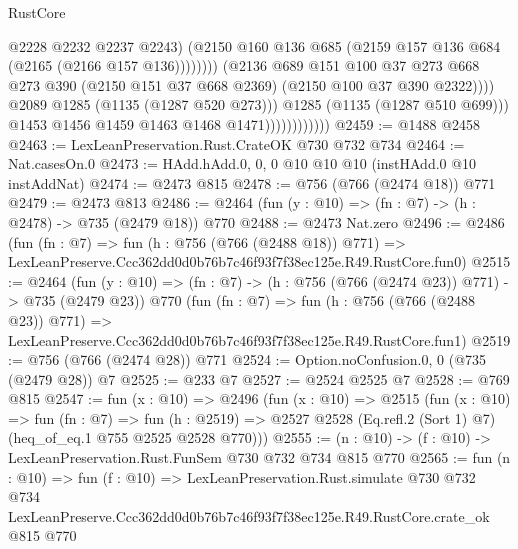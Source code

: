 \begin{lexlean}{RustCore}
\begin{coremodule}
                                              @2228
                                              @2232
                                              @2237
                                              @2243)
                                            (@2150
                                              @160
                                              @136
                                              @685
                                              (@2159 @157 @136 @684 (@2165 (@2166 @157 @136))))))))
                                    (@2136
                                      @689
                                      @151
                                      @100
                                      @37
                                      @273
                                      @668
                                      @273
                                      @390
                                      (@2150 @151 @37 @668 @2369)
                                      (@2150 @100 @37 @390 @2322))))
                                @2089
                                @1285
                                (@1135 (@1287 @520 @273)))
                              @1285
                              (@1135 (@1287 @510 @699)))
                            @1453
                            @1456
                            @1459
                            @1463
                            @1468
                            @1471))))))))))))
@2459 := @1488 @2458
@2463 := LexLeanPreservation.Rust.CrateOK @730 @732 @734
@2464 := Nat.casesOn.{0}
@2473 := HAdd.hAdd.{0, 0, 0} @10 @10 @10 (instHAdd.{0} @10 instAddNat)
@2474 := @2473 @815
@2478 := @756 (@766 (@2474 @18)) @771
@2479 := @2473 @813
@2486 := @2464 (fun (y : @10) => (fn : @7) -> (h : @2478) -> @735 (@2479 @18)) @770
@2488 := @2473 Nat.zero
@2496 := @2486
    (fun (fn : @7) =>
    fun (h : @756 (@766 (@2488 @18)) @771) =>
    LexLeanPreserve.Ccc362dd0d0b76b7c46f93f7f38ec125e.R49.RustCore.fun0)
@2515 := @2464
    (fun (y : @10) => (fn : @7) -> (h : @756 (@766 (@2474 @23)) @771) -> @735 (@2479 @23))
    @770
    (fun (fn : @7) =>
    fun (h : @756 (@766 (@2488 @23)) @771) =>
    LexLeanPreserve.Ccc362dd0d0b76b7c46f93f7f38ec125e.R49.RustCore.fun1)
@2519 := @756 (@766 (@2474 @28)) @771
@2524 := Option.noConfusion.{0, 0} (@735 (@2479 @28)) @7
@2525 := @233 @7
@2527 := @2524 @2525 @7
@2528 := @769 @815
@2547 := fun (x : @10) =>
  @2496
    (fun (x : @10) =>
    @2515
      (fun (x : @10) =>
      fun (fn : @7) =>
      fun (h : @2519) =>
      @2527 @2528 (Eq.refl.{2} (Sort 1) @7) (heq_of_eq.{1} @755 @2525 @2528 @770)))
@2555 := (n : @10) -> (f : @10) -> LexLeanPreservation.Rust.FunSem @730 @732 @734 @815 @770
@2565 := fun (n : @10) =>
  fun (f : @10) =>
  LexLeanPreservation.Rust.simulate
    @730
    @732
    @734
    LexLeanPreserve.Ccc362dd0d0b76b7c46f93f7f38ec125e.R49.RustCore.crate_ok
    @815
    @770
\end{coremodule}
\end{lexlean}
